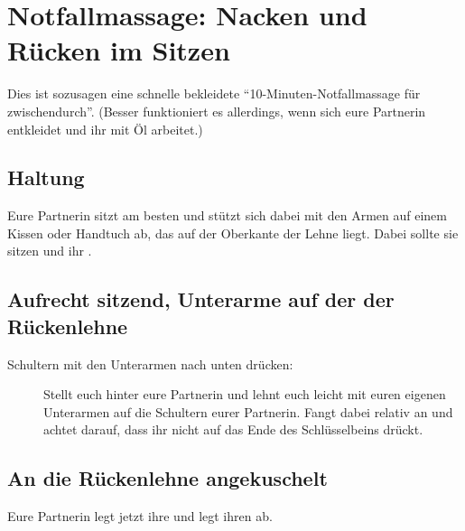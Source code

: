 \section{Notfallmassage: Nacken und Rücken im Sitzen}

Dies ist sozusagen eine schnelle bekleidete "`10-Minuten-Notfallmassage für zwischendurch"'. (Besser funktioniert es allerdings, wenn sich eure Partnerin entkleidet und ihr mit Öl arbeitet.)

\subsection{Haltung}

Eure Partnerin sitzt am besten  und stützt sich dabei mit den Armen auf einem Kissen oder Handtuch ab, das auf der Oberkante der Lehne liegt. Dabei sollte sie  sitzen und ihr .

\subsection{Aufrecht sitzend, Unterarme auf der der Rückenlehne}

\begin{description}
  \item [Schultern mit den Unterarmen nach unten drücken:] Stellt euch hinter eure Partnerin und lehnt euch leicht mit euren eigenen Unterarmen auf die Schultern eurer Partnerin. Fangt dabei relativ  an und achtet darauf, dass ihr nicht auf das Ende des Schlüsselbeins drückt.
\end{description}

\subsection{An die Rückenlehne angekuschelt}

Eure Partnerin legt jetzt ihre  und legt ihren  ab.

